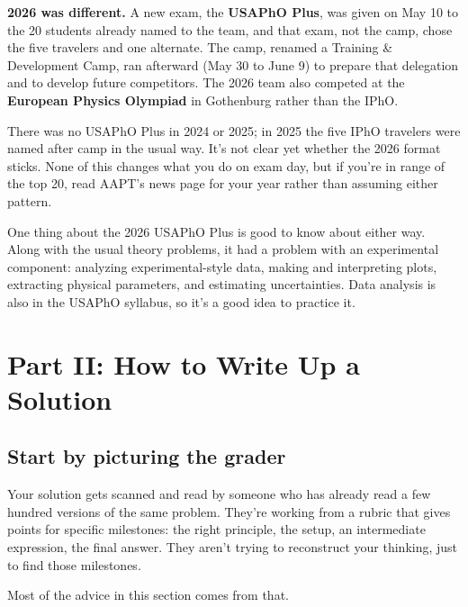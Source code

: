 \documentclass[11pt]{article}
\begin{document}
\begin{warnbox}
\textbf{2026 was different.} A new exam, the \textbf{USAPhO Plus}, was given on May 10 to
the 20 students already named to the team, and that exam, not the camp, chose the five
travelers and one alternate. The camp, renamed a Training \& Development Camp, ran afterward
(May 30 to June 9) to prepare that delegation and to develop future competitors. The 2026
team also competed at the \textbf{European Physics Olympiad} in Gothenburg rather than the
IPhO.

There was no USAPhO Plus in 2024 or 2025; in 2025 the five IPhO travelers were named after
camp in the usual way. It's not clear yet whether the 2026 format sticks. None of this
changes what you do on exam day, but if you're in range of the top 20, read AAPT's news page
for your year rather than assuming either pattern.
\end{warnbox}

One thing about the 2026 USAPhO Plus is good to know about either way. Along with the usual
theory problems, it had a problem with an experimental component: analyzing
experimental-style data, making and interpreting plots, extracting physical parameters, and
estimating uncertainties. Data analysis is also in the USAPhO syllabus, so it's a good idea
to practice it.

\section{Part II: How to Write Up a Solution}

\subsection*{Start by picturing the grader}

Your solution gets scanned and read by someone who has already read a few hundred versions
of the same problem. They're working from a rubric that gives points for specific
milestones: the right principle, the setup, an intermediate expression, the final answer.
They aren't trying to reconstruct your thinking, just to find those milestones.

Most of the advice in this section comes from that.
\end{document}

